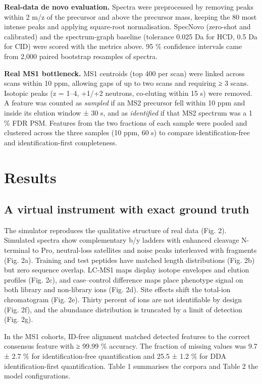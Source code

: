 \documentclass[
]{article}
\begin{document}
\textbf{Real-data de novo evaluation.} Spectra were preprocessed by
removing peaks within 2 m/z of the precursor and above the precursor
mass, keeping the 80 most intense peaks and applying square-root
normalisation. SpecNovo (zero-shot and calibrated) and the
spectrum-graph baseline (tolerance 0.025 Da for HCD, 0.5 Da for CID)
were scored with the metrics above. 95 \% confidence intervals came from
2,000 paired bootstrap resamples of spectra.

\textbf{Real MS1 bottleneck.} MS1 centroids (top 400 per scan) were
linked across scans within 10 ppm, allowing gaps of up to two scans and
requiring ≥ 3 scans. Isotopic peaks (z = 1--4, +1/+2 neutrons,
co-eluting within 15 s) were removed. A feature was counted as
\emph{sampled} if an MS2 precursor fell within 10 ppm and inside its
elution window ± 30 s, and as \emph{identified} if that MS2 spectrum was
a 1 \% FDR PSM. Features from the two fractions of each sample were
pooled and clustered across the three samples (10 ppm, 60 s) to compare
identification-free and identification-first completeness.

\hypertarget{results}{%
\section{Results}\label{results}}

\hypertarget{a-virtual-instrument-with-exact-ground-truth}{%
\subsection{A virtual instrument with exact ground
truth}\label{a-virtual-instrument-with-exact-ground-truth}}

The simulator reproduces the qualitative structure of real data (Fig.
2). Simulated spectra show complementary b/y ladders with enhanced
cleavage N-terminal to Pro, neutral-loss satellites and noise peaks
interleaved with fragments (Fig. 2a). Training and test peptides have
matched length distributions (Fig. 2b) but zero sequence overlap. LC-MS1
maps display isotope envelopes and elution profiles (Fig. 2c), and
case--control difference maps place phenotype signal on both library and
non-library ions (Fig. 2d). Site effects shift the total-ion
chromatogram (Fig. 2e). Thirty percent of ions are not identifiable by
design (Fig. 2f), and the abundance distribution is truncated by a limit
of detection (Fig. 2g).

In the MS1 cohorts, ID-free alignment matched detected features to the
correct consensus feature with ≥ 99.99 \% accuracy. The fraction of
missing values was 9.7 ± 2.7 \% for identification-free quantification
and 25.5 ± 1.2 \% for DDA identification-first quantification. Table 1
summarises the corpora and Table 2 the model configurations.
\end{document}
